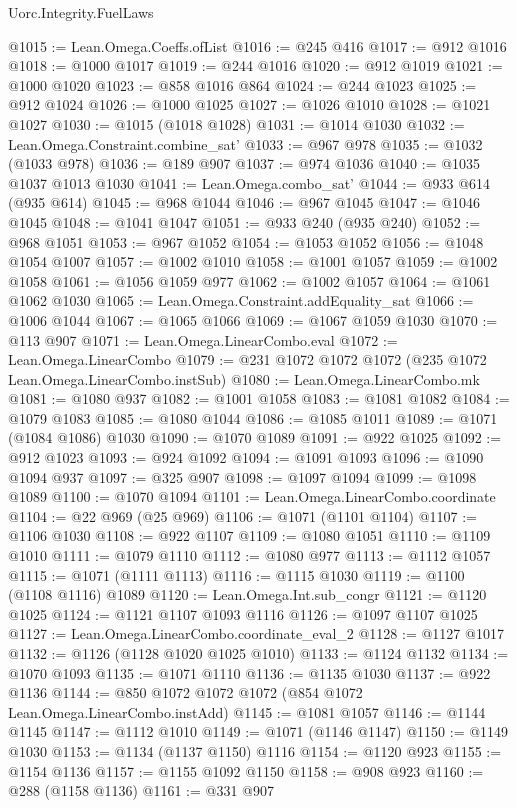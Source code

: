 \begin{lexlean}{Uorc.Integrity.FuelLaws}
\begin{coremodule}
@1015 := Lean.Omega.Coeffs.ofList
@1016 := @245 @416
@1017 := @912 @1016
@1018 := @1000 @1017
@1019 := @244 @1016
@1020 := @912 @1019
@1021 := @1000 @1020
@1023 := @858 @1016 @864
@1024 := @244 @1023
@1025 := @912 @1024
@1026 := @1000 @1025
@1027 := @1026 @1010
@1028 := @1021 @1027
@1030 := @1015 (@1018 @1028)
@1031 := @1014 @1030
@1032 := Lean.Omega.Constraint.combine_sat'
@1033 := @967 @978
@1035 := @1032 (@1033 @978)
@1036 := @189 @907
@1037 := @974 @1036
@1040 := @1035 @1037 @1013 @1030
@1041 := Lean.Omega.combo_sat'
@1044 := @933 @614 (@935 @614)
@1045 := @968 @1044
@1046 := @967 @1045
@1047 := @1046 @1045
@1048 := @1041 @1047
@1051 := @933 @240 (@935 @240)
@1052 := @968 @1051
@1053 := @967 @1052
@1054 := @1053 @1052
@1056 := @1048 @1054 @1007
@1057 := @1002 @1010
@1058 := @1001 @1057
@1059 := @1002 @1058
@1061 := @1056 @1059 @977
@1062 := @1002 @1057
@1064 := @1061 @1062 @1030
@1065 := Lean.Omega.Constraint.addEquality_sat
@1066 := @1006 @1044
@1067 := @1065 @1066
@1069 := @1067 @1059 @1030
@1070 := @113 @907
@1071 := Lean.Omega.LinearCombo.eval
@1072 := Lean.Omega.LinearCombo
@1079 := @231 @1072 @1072 @1072 (@235 @1072 Lean.Omega.LinearCombo.instSub)
@1080 := Lean.Omega.LinearCombo.mk
@1081 := @1080 @937
@1082 := @1001 @1058
@1083 := @1081 @1082
@1084 := @1079 @1083
@1085 := @1080 @1044
@1086 := @1085 @1011
@1089 := @1071 (@1084 @1086) @1030
@1090 := @1070 @1089
@1091 := @922 @1025
@1092 := @912 @1023
@1093 := @924 @1092
@1094 := @1091 @1093
@1096 := @1090 @1094 @937
@1097 := @325 @907
@1098 := @1097 @1094
@1099 := @1098 @1089
@1100 := @1070 @1094
@1101 := Lean.Omega.LinearCombo.coordinate
@1104 := @22 @969 (@25 @969)
@1106 := @1071 (@1101 @1104)
@1107 := @1106 @1030
@1108 := @922 @1107
@1109 := @1080 @1051
@1110 := @1109 @1010
@1111 := @1079 @1110
@1112 := @1080 @977
@1113 := @1112 @1057
@1115 := @1071 (@1111 @1113)
@1116 := @1115 @1030
@1119 := @1100 (@1108 @1116) @1089
@1120 := Lean.Omega.Int.sub_congr
@1121 := @1120 @1025
@1124 := @1121 @1107 @1093 @1116
@1126 := @1097 @1107 @1025
@1127 := Lean.Omega.LinearCombo.coordinate_eval_2
@1128 := @1127 @1017
@1132 := @1126 (@1128 @1020 @1025 @1010)
@1133 := @1124 @1132
@1134 := @1070 @1093
@1135 := @1071 @1110
@1136 := @1135 @1030
@1137 := @922 @1136
@1144 := @850 @1072 @1072 @1072 (@854 @1072 Lean.Omega.LinearCombo.instAdd)
@1145 := @1081 @1057
@1146 := @1144 @1145
@1147 := @1112 @1010
@1149 := @1071 (@1146 @1147)
@1150 := @1149 @1030
@1153 := @1134 (@1137 @1150) @1116
@1154 := @1120 @923
@1155 := @1154 @1136
@1157 := @1155 @1092 @1150
@1158 := @908 @923
@1160 := @288 (@1158 @1136)
@1161 := @331 @907

\end{coremodule}
\end{lexlean}
